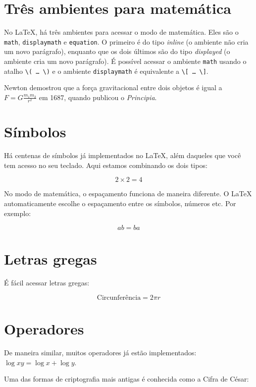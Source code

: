 \documentclass[a4paper,oneside]{article}
\begin{document}
\frenchspacing

\section{Três ambientes para matemática}

No \LaTeX, há três ambientes para acessar o modo de matemática. Eles são o
\texttt{math}, \texttt{displaymath} e \texttt{equation}. O primeiro é do tipo
\emph{inline} (o ambiente não cria um novo parágrafo), enquanto que os dois
últimos são do tipo \emph{displayed} (o ambiente cria um novo parágrafo).
É possível acessar o ambiente \texttt{math} usando o atalho \verb+\( … \)+ e o
ambiente \texttt{displaymath} é equivalente a \verb+\[ … \]+.

\bigskip
Newton demostrou que a força gravitacional entre dois objetos é igual a \( F =
G \frac{m_1 m_2}{r^2} \) em 1687, quando publicou o \emph{Principia}.

\section{Símbolos}

Há centenas de símbolos já implementados no LaTeX, além daqueles que você tem
acesso no seu teclado. Aqui estamos combinando os dois tipos:

\[ 2 \times 2 = 4 \]

No modo de matemática, o espaçamento funciona de maneira diferente. O LaTeX
automaticamente escolhe o espaçamento entre os símbolos, números etc. Por
exemplo:

\[ ab = ba \]

\section{Letras gregas}

É fácil acessar letras gregas:

\[ \text{Circunferência} = 2 \pi r \]

\section{Operadores}

De maneira similar, muitos operadores já estão implementados: \( \log xy = \log
x + \log y \).

Uma das formas de criptografia mais antigas é conhecida como a Cifra de César:
\end{document}
